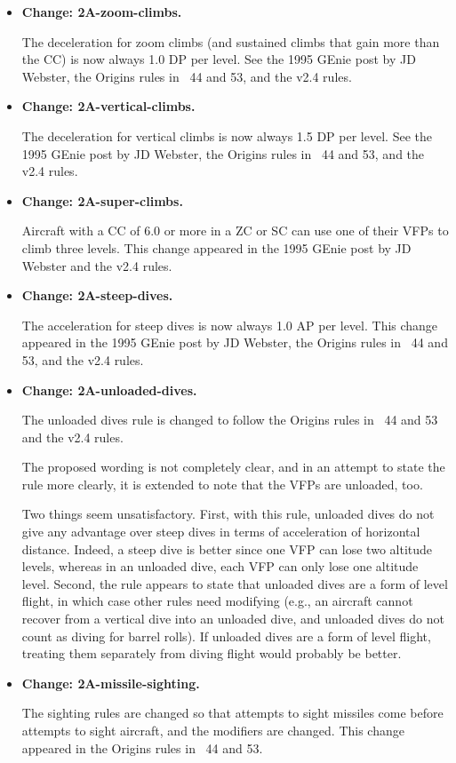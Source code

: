 \documentclass[10pt]{report}
\newcommand{\itemtag}[1]{\item \textbf{Change: #1.}\par}
\begin{document}
\begin{itemize}
    For aircraft with low and high bleed rates, the sustained turning penalties are 0.5 and 1.5 DP. This change was included in the “Props against Jets” article in {\APJ}~32 and the Origins rules {\APJ}~39, 44, and 53 and the v2.4 rules.

    \itemtag{2A-zoom-climbs} The deceleration for zoom climbs (and sustained climbs that gain more than the CC) is now always 1.0 DP per level. See the 1995 GEnie post by JD Webster, the Origins rules {in \APJ}~44 and 53, and the v2.4 rules.

    \itemtag{2A-vertical-climbs} The deceleration for vertical climbs is now always 1.5 DP per level. See the 1995 GEnie post by JD Webster, the Origins rules {in \APJ}~44 and 53, and the v2.4 rules.

    \itemtag{2A-super-climbs} Aircraft with a CC of 6.0 or more in a ZC or SC can use one of their VFPs to climb three levels. This change appeared in the 1995 GEnie post by JD Webster and the v2.4 rules.

    \itemtag{2A-steep-dives} The acceleration for steep dives is now always 1.0 AP per level. This change appeared in the 1995 GEnie post by JD Webster, the Origins rules in {\APJ}~44 and 53, and the v2.4 rules.

    \itemtag{2A-unloaded-dives} The unloaded dives rule is changed to follow the Origins rules in {\APJ}~44 and 53 and the v2.4 rules.
    
    The proposed wording is not completely clear, and in an attempt to state the rule more clearly, it is extended to note that the VFPs are unloaded, too. 
    
    Two things seem unsatisfactory. First, with this rule, unloaded dives do not give any advantage over steep dives in terms of acceleration of horizontal distance. Indeed, a steep dive is better since one VFP can lose two altitude levels, whereas in an unloaded dive, each VFP can only lose one altitude level. Second, the rule appears to state that unloaded dives are a form of level flight, in which case other rules need modifying (e.g., an aircraft cannot recover from a vertical dive into an unloaded dive, and unloaded dives do not count as diving for barrel rolls). If unloaded dives are a form of level flight, treating them separately from diving flight would probably be better.

    \itemtag{2A-missile-sighting} The sighting rules are changed so that attempts to sight missiles come before attempts to sight aircraft, and the modifiers are changed. This change appeared in the Origins rules in {\APJ}~44 and 53.
    

\end{itemize}
\end{document}
